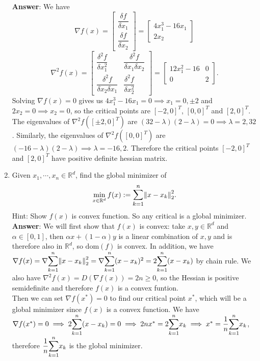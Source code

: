 \documentclass{article}
\begin{document}
\begin{enumerate}
          \textbf{Answer}: We have \[
              \nabla f(x)=\begin{bmatrix}
                  \dfrac{\delta f}{\delta x_1} \\\dfrac{\delta f}{\delta x_2}
              \end{bmatrix}=\begin{bmatrix}
                  4x_1^3-16x_1 \\2x_2
              \end{bmatrix}
          \]\[
              \nabla^2 f(x)=\begin{bmatrix}
                  \dfrac{\delta^2 f}{\delta x_1^2} & \dfrac{\delta^2 f}{\delta x_1\delta x_2} \\\dfrac{\delta^2 f}{\delta x_2\delta x_1}&\dfrac{\delta^2 f}{\delta x_2^2}
              \end{bmatrix}=\begin{bmatrix}
                  12x_1^2-16 & 0 \\
                  0          & 2
              \end{bmatrix}.
          \] Solving $\nabla f(x)=0$ gives us $4x_1^3-16x_1=0\implies x_1=0,\pm 2$ and $2x_2=0\implies x_2=0$, so the critical points are $[-2,0]^T$, $[0,0]^T$ and $[2,0]^T$. The eigenvalues of $\nabla^2 f([\pm 2, 0]^T)$ are $(32-\lambda)(2-\lambda)=0\implies\lambda=2,32$. Similarly, the eigenvalues of $\nabla^2 f([0, 0]^T)$ are $(-16-\lambda)(2-\lambda)\implies\lambda=-16,2$. Therefore the critical points $[-2,0]^T$ and $[2,0]^T$ have positive definite hessian matrix.
          \newpage
    \item Given $x_1,\cdots,x_n\in\mathbb{R}^d$, find the global minimizer of \[\min_{x\in\mathbb{R}^d} f(x):=\mathlarger{\sum_{k=1}^n}\norm{x-x_k}_2^2.\] Hint: Show $f(x)$ is convex function. So any critical is a global minimizer.\\
    \textbf{Answer}: We will first show that $f(x)$ is convex: take $x,y\in\mathbb{R}^d$ and $\alpha\in[0,1]$, then $\alpha x+(1-\alpha)y$ is a linear combination of $x,y$ and is therefore also in $\mathbb{R}^d$, so $\text{dom}(f)$ is convex. In addition, we have $\nabla f(x)=\nabla\mathlarger{\sum_{k=1}^n}\norm{x-x_k}_2^2=\nabla\mathlarger{\sum_{k=1}^n}(x-x_k)^2=2\mathlarger{\sum_{k=1}^n}(x-x_k)$ by chain rule. We also have $\nabla^2 f(x)=D(\nabla f(x))=2n\geq 0$, so the Hessian is positive semidefinite and therefore $f(x)$ is a convex funtion.\\ Then we can set $\nabla f(x^*)=0$ to find our critical point $x^*$, which will be a global minimizer since $f(x)$ is a convex function. We have $\nabla f(x^*)=0\implies 2\mathlarger{\sum_{k=1}^n}(x-x_k)=0\implies 2nx^*=2\mathlarger{\sum_{k=1}^n}x_k\implies x^*=\dfrac{1}{n}\mathlarger{\sum_{k=1}^n}x_k$, therefore $\dfrac{1}{n}\mathlarger{\sum_{k=1}^n}x_k$ is the global minimizer.
\end{enumerate}
\end{document}
